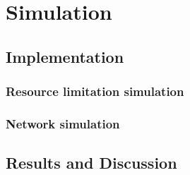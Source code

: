 \chapter{Simulation}\label{ch:simulation}

\section{Implementation}\label{sec:simulation:implementation}

\subsection{Resource limitation simulation}

\subsection{Network simulation}

\section{Results and Discussion}\label{sec:simulation:results_and_discussion}
